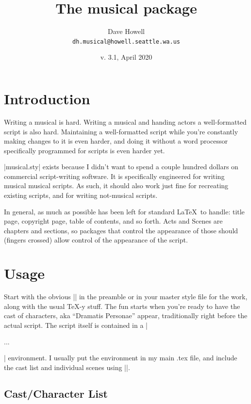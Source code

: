 \documentclass{article}
\providecommand*{\url}{\texttt}
\begin{document}
\title{The \textsf{musical} package}
\author{Dave Howell \\ \url{dh.musical@howell.seattle.wa.us}}
\date{v. 3.1, April 2020}

\maketitle

\section{Introduction}

Writing a musical is hard. Writing a musical and handing actors a well-formatted script is also hard. Maintaining a well-formatted script while you’re constantly making changes to it is even harder, and doing it without a word processor specifically programmed for scripts is even harder yet. 

|musical.sty| exists because I didn’t want to spend a couple hundred dollars on commercial script-writing software. It is specifically engineered for writing musical musical scripts. As such, it should also work just fine for recreating existing scripts, and for writing not-musical scripts.

In general, as much as possible has been left for standard \LaTeX\ to handle: title page, copyright page, table of contents, and so forth. Acts and Scenes are chapters and sections, so packages that control the appearance of those should (fingers crossed) allow control of the appearance of the script. 

\section{Usage}

 Start with the obvious |\RequirePackage{musical}| in the preamble or in your master style file for the work, along with the usual \TeX-y stuff.  The fun starts when you’re ready to have the cast of characters, aka “Dramatis Personae” appear, traditionally right before the actual script. The script itself is contained in a |\begin{script}...\end{script}| environment. I usually put the environment in my main .tex file, and include the cast list and individual scenes using ||.

\subsection{Cast/Character List}
\end{document}
